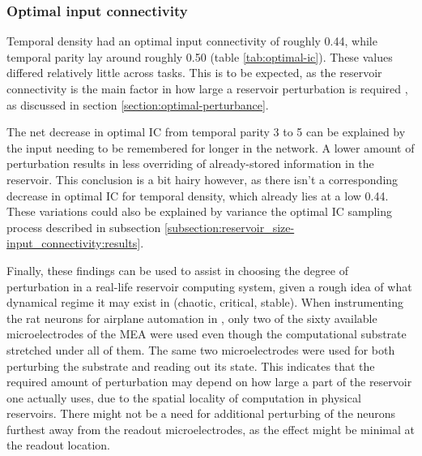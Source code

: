 \subsubsection{Optimal input connectivity}

Temporal density had an optimal input connectivity of roughly 0.44, while temporal parity lay around roughly 0.50 (table \ref{tab:optimal-ic}).
These values differed relatively little across tasks.
This is to be expected, as the reservoir connectivity is the main factor in how large a reservoir perturbation is required \cite{rbn-reservoir},
as discussed in section \ref{section:optimal-perturbance}.

The net decrease in optimal IC from temporal parity 3 to 5 can be explained by the input needing to be remembered for longer in the network.
A lower amount of perturbation results in less overriding of already-stored information in the reservoir.
This conclusion is a bit hairy however,
as there isn't a corresponding decrease in optimal IC for temporal density, which already lies at a low 0.44.
These variations could also be explained by variance the optimal IC sampling process described in subsection \ref{subsection:reservoir_size-input_connectivity:results}.

Finally, these findings can be used to assist in choosing the degree of perturbation in a real-life reservoir computing system,
given a rough idea of what dynamical regime it may exist in (chaotic, critical, stable).
When instrumenting the rat neurons for airplane automation in \cite{demarse2005adaptive},
only two of the sixty available microelectrodes of the MEA were used even though the computational substrate stretched under all of them.
The same two microelectrodes were used for both perturbing the substrate and reading out its state.
This indicates that the required amount of perturbation may depend on how large a part of the reservoir one actually uses,
due to the spatial locality of computation in physical reservoirs.
There might not be a need for additional perturbing of the neurons furthest away from the readout microelectrodes,
as the effect might be minimal at the readout location.
